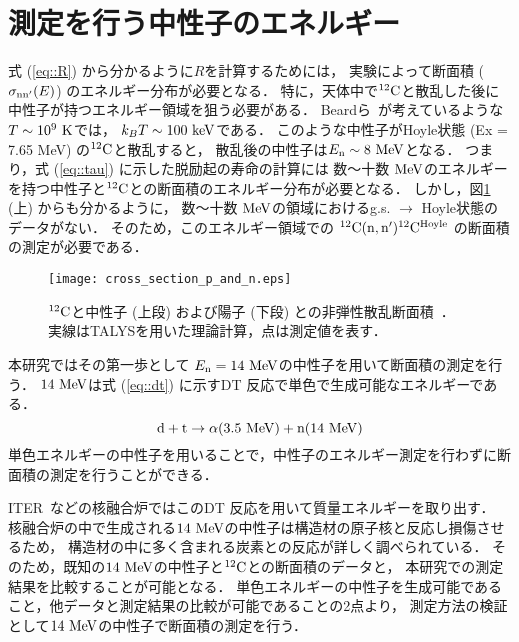\documentclass[../master]{subfiles}
\begin{document}
\section{測定を行う中性子のエネルギー}
式 (\ref{eq::R}) から分かるように$R$を計算するためには，
実験によって断面積 ($\sigma_{\rm nn'} (E)$) のエネルギー分布が必要となる．
特に，天体中で${}^{12}{\rm C}$と散乱した後に中性子が持つエネルギー領域を狙う必要がある．
Beardら~\cite{hotdensemedium}が考えているような$T\sim10^{9}~{\rm K}$では，
$k_{B}T\sim100~{\rm keV}$である．%
このような中性子がHoyle状態 (Ex = 7.65 MeV) の${}^{12}{\rm C}$と散乱すると，
散乱後の中性子は$E_{\rm n}\sim8~{\rm MeV}$となる．
つまり，式 (\ref{eq::tau}) に示した脱励起の寿命の計算には
数〜十数 ${\rm MeV}$のエネルギーを持つ中性子と${}^{12}{\rm C}$との断面積のエネルギー分布が必要となる．
しかし，図\ref{fig::crosssection_pres} (上) からも分かるように，
数〜十数 ${\rm MeV}$の領域におけるg.s. $\rightarrow$ Hoyle状態のデータがない．
そのため，このエネルギー領域での ${}^{12}{\rm C}({\rm n,n'}){}^{12}{\rm C}^{{\rm Hoyle}}$ の断面積の測定が必要である．
\begin{figure}
  \centering
  \texttt{[image: cross\_section\_p\_and\_n.eps]}
  \caption[${}^{12}{\rm C}$と中性子 (上段) および陽子 (下段) との非弾性散乱断面積．]
          {${}^{12}{\rm C}$と中性子 (上段) および陽子 (下段) との非弾性散乱断面積~\cite{hotdensemedium}．
  実線はTALYSを用いた理論計算，点は測定値を表す．}
  \label{fig::crosssection_pres}
\end{figure}
本研究ではその第一歩として
$E_{\rm n} = 14~{\rm MeV}$の中性子を用いて断面積の測定を行う．
$14~{\rm MeV}$は式 (\ref{eq::dt}) に示すDT 反応で単色で生成可能なエネルギーである．
\begin{equation}
  {\rm d} + {\rm t} \rightarrow \alpha (3.5~{\rm MeV}) + {\rm n} (14~{\rm MeV})
  \label{eq::dt}
\end{equation}
単色エネルギーの中性子を用いることで，中性子のエネルギー測定を行わずに断面積の測定を行うことができる．

ITER~\cite{iter}などの核融合炉ではこのDT 反応を用いて質量エネルギーを取り出す．
核融合炉の中で生成される$14~{\rm MeV}$の中性子は構造材の原子核と反応し損傷させるため，
構造材の中に多く含まれる炭素との反応が詳しく調べられている．
そのため，既知の$14~{\rm MeV}$の中性子と${}^{12}{\rm C}$との断面積のデータと，
本研究での測定結果を比較することが可能となる．
単色エネルギーの中性子を生成可能であること，他データと測定結果の比較が可能であることの2点より，
測定方法の検証として$14~{\rm MeV}$の中性子で断面積の測定を行う．
\end{document}
